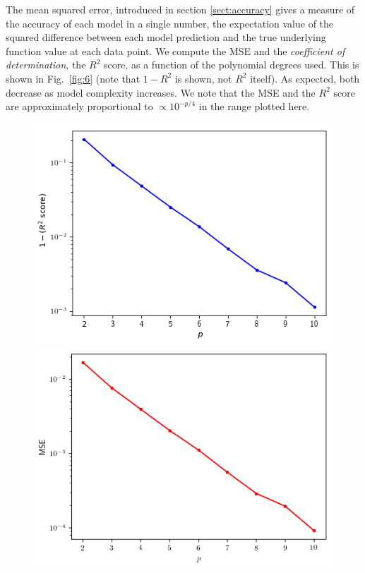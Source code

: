 \documentclass[a4paper]{article}
\newcommand{\fig}[1]{Fig.\ \ref{fig:#1}}
\begin{document}
\begin{multicols}{2}
The mean squared error, introduced in section \ref{sect:accuracy} gives a measure of the accuracy of each model in a single number, the expectation value of the squared difference between each model prediction and the true underlying function value at each data point. We compute the MSE and the \textit{coefficient of determination}, the $R^2$ score, as a function of the polynomial degrees used. This is shown in \fig{6} (note that $1-R^2$ is shown, not $R^2$ itself). As expected, both decrease as model complexity increases. We note that the MSE and the $R^2$ score are approximately proportional to $\propto 10^{-p/4}$ in the range plotted here.

\begin{figure}
\centering
\includegraphics[width=0.49\linewidth]{OLS_R2.png}
\includegraphics[width=0.49\linewidth]{OLS_MSE.png}
\end{figure}


\end{multicols}
\end{document}
